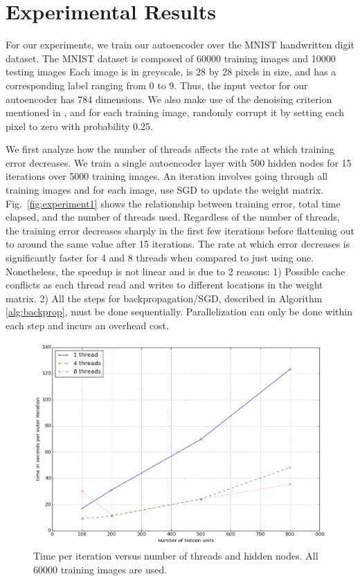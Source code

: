 \documentclass[conference]{IEEEtran}
\begin{document}
\section{Experimental Results}
For our experiments, we train our autoencoder over the MNIST handwritten digit dataset. The MNIST dataset is composed of 60000 training images and 10000 testing images Each image is in greyscale, is 28 by 28 pixels in size, and has a corresponding label ranging from 0 to 9. Thus, the input vector for our autoencoder has 784 dimensions. We also make use of the denoising criterion mentioned in \cite{vincent2010stacked}, and for each training image, randomly corrupt it by setting each pixel to zero with probability 0.25. 

We first analyze how the number of threads affects the rate at which training error decreases. We train a single autoencoder layer with 500 hidden nodes for 15 iterations over 5000 training images. An iteration involves going through all training images and for each image, use SGD to update the weight matrix. Fig.~\ref{fig:experiment1} shows the relationship between training error, total time elapsed, and the number of threads used. Regardless of the number of threads, the training error decreases sharply in the first few iterations before flattening out to around the same value after 15 iterations. The rate at which error decreases is significantly faster for 4 and 8 threads when compared to just using one. Nonetheless, the speedup is not linear and is due to 2 reasons: 1) Possible cache conflicts as each thread read and writes to different locations in the weight matrix. 2) All the steps for backpropagation/SGD, described in Algorithm \ref{alg:backprop}, must be done sequentially. Parallelization can only be done within each step and incurs an overhead cost.

\begin{figure}[h]
\centering
\includegraphics[width=0.9\linewidth]{experiment2.png}
\caption{Time per iteration versus number of threads and hidden nodes. All 60000 training images are used.}
\label{fig:experiment2}
\end{figure}
\end{document}
